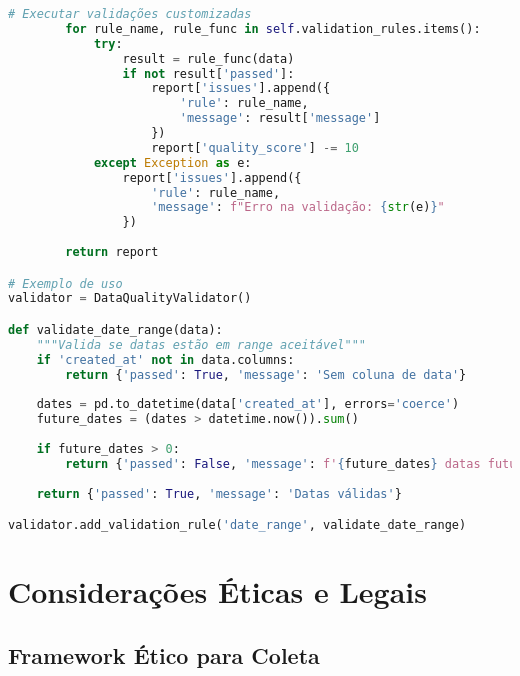 \begin{pythonbox}
\begin{lstlisting}[language=Python]        
        # Executar validações customizadas
        for rule_name, rule_func in self.validation_rules.items():
            try:
                result = rule_func(data)
                if not result['passed']:
                    report['issues'].append({
                        'rule': rule_name,
                        'message': result['message']
                    })
                    report['quality_score'] -= 10
            except Exception as e:
                report['issues'].append({
                    'rule': rule_name,
                    'message': f"Erro na validação: {str(e)}"
                })
        
        return report

# Exemplo de uso
validator = DataQualityValidator()

def validate_date_range(data):
    """Valida se datas estão em range aceitável"""
    if 'created_at' not in data.columns:
        return {'passed': True, 'message': 'Sem coluna de data'}
    
    dates = pd.to_datetime(data['created_at'], errors='coerce')
    future_dates = (dates > datetime.now()).sum()
    
    if future_dates > 0:
        return {'passed': False, 'message': f'{future_dates} datas futuras encontradas'}
    
    return {'passed': True, 'message': 'Datas válidas'}

validator.add_validation_rule('date_range', validate_date_range)
\end{lstlisting}
\end{pythonbox}

\section{Considerações Éticas e Legais}

\subsection{Framework Ético para Coleta}

